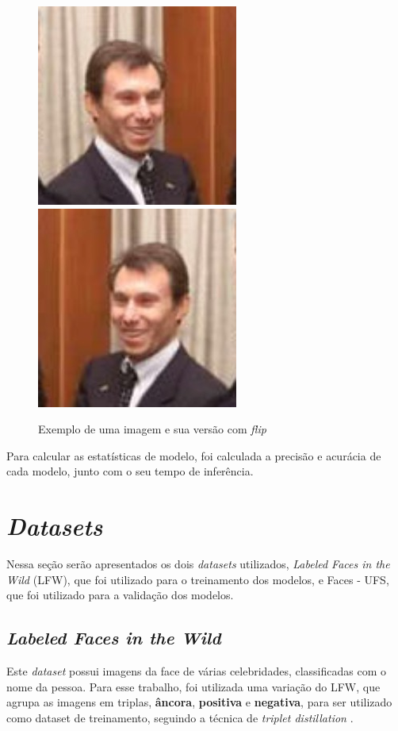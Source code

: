 \begin{figure}[htb]
	\caption {\label{exemplo_flip}Exemplo de uma imagem e sua versão com \textit{flip}}
	\begin{center}
		\includegraphics[scale=0.5]{Imagens/exemplo_flip_01}
		\includegraphics[scale=0.5]{Imagens/exemplo_flip_02}
	\end{center}
\end{figure}

Para calcular as estatísticas de modelo, foi calculada a precisão e acurácia de cada modelo, junto com o seu tempo de
inferência.

\section{\textit{Datasets}}\label{sec_datasets}
Nessa seção serão apresentados os dois \textit{datasets} utilizados, \textit{Labeled Faces in the Wild} (LFW),
que foi utilizado para o treinamento dos modelos, e Faces - UFS, que foi utilizado para a validação dos modelos.

\subsection{\textit{Labeled Faces in the Wild}}
Este \textit{dataset} possui imagens da face de várias celebridades, classificadas com o nome da pessoa.
Para esse trabalho, foi utilizada uma variação do LFW, que agrupa as imagens em triplas, \textbf{âncora},
\textbf{positiva} e \textbf{negativa}, para ser utilizado como dataset de treinamento, seguindo a técnica
de \textit{triplet distillation} \cite{triplet_distillation_face_recognition}.


